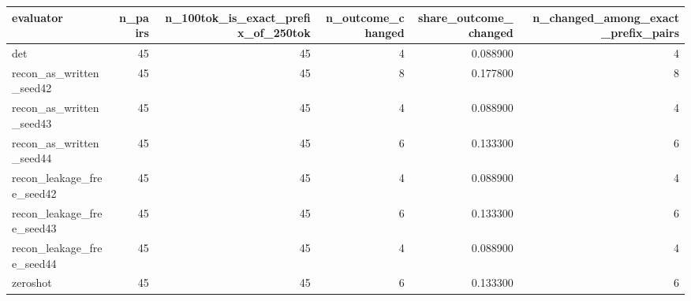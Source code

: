 \begin{tabular}{lrrrrr}
\toprule
evaluator & n_pairs & n_100tok_is_exact_prefix_of_250tok & n_outcome_changed & share_outcome_changed & n_changed_among_exact_prefix_pairs \\
\midrule
det & 45 & 45 & 4 & 0.088900 & 4 \\
recon_as_written_seed42 & 45 & 45 & 8 & 0.177800 & 8 \\
recon_as_written_seed43 & 45 & 45 & 4 & 0.088900 & 4 \\
recon_as_written_seed44 & 45 & 45 & 6 & 0.133300 & 6 \\
recon_leakage_free_seed42 & 45 & 45 & 4 & 0.088900 & 4 \\
recon_leakage_free_seed43 & 45 & 45 & 6 & 0.133300 & 6 \\
recon_leakage_free_seed44 & 45 & 45 & 4 & 0.088900 & 4 \\
zeroshot & 45 & 45 & 6 & 0.133300 & 6 \\
\bottomrule
\end{tabular}

